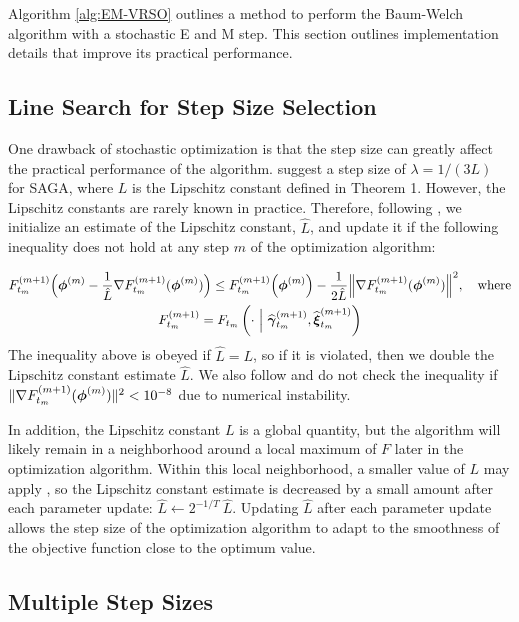 Algorithm \ref{alg:EM-VRSO} outlines a method to perform the Baum-Welch algorithm with a stochastic E and M step. This section outlines implementation details that improve its practical performance.

\subsection{Line Search for Step Size Selection}
\label{subsec:est_L}

One drawback of stochastic optimization is that the step size can greatly affect the practical performance of the algorithm. \citet{Defazio:2014} suggest a step size of $\lambda = 1/(3L)$ for SAGA, where $L$ is the Lipschitz constant defined in Theorem 1. However, the Lipschitz constants are rarely known in practice. Therefore, following \citet{Schmidt:2017}, we initialize an estimate of the Lipschitz constant, $\hat L$, and update it if the following inequality does not hold at any step $m$ of the optimization algorithm:

\begin{gather}
    F^{(m+1)}_{t_m}\Big(\boldsymbol{\phi}^{(m)} - \frac{1}{\hat L} \nabla F_{t_m}^{(m+1)}(\boldsymbol{\phi}^{(m)}) \Big) \leq F^{(m+1)}_{t_m}\Big(\boldsymbol{\phi}^{(m)}\Big) - \frac{1}{2 \hat L} \Big\| \nabla F_{t_m}^{(m+1)}(\boldsymbol{\phi}^{(m)}) \Big\| ^2, \quad \text{where} \nonumber \\
    F_{t_m}^{(m+1)} = F_{t_m}\left(\cdot ~ \Big | ~ \widehat {\boldsymbol{\gamma}}^{(m+1)}_{t_m}, \widehat {\boldsymbol{\xi}}^{(m+1)}_{t_m}\right)
    \label{ineq:F}
\end{gather}
%
The inequality above is obeyed if $\hat L = L$, so if it is violated, then we double the Lipschitz constant estimate $\hat L$. We also follow \citet{Schmidt:2017} and do not check the inequality if $\| \nabla F_{t_m}^{(m+1)}(\boldsymbol{\phi}^{(m)})\|^2 < 10^{-8}$ due to numerical instability. 

In addition, the Lipschitz constant $L$ is a global quantity, but the algorithm will likely remain in a neighborhood around a local maximum of $F$ later in the optimization algorithm. Within this local neighborhood, a smaller value of $L$ may apply \citep{Schmidt:2017}, so the Lipschitz constant estimate is decreased by a small amount after each parameter update: $\hat L \leftarrow 2^{-1/T} ~ \hat L$. Updating $\hat L$ after each parameter update allows the step size of the optimization algorithm to adapt to the smoothness of the objective function close to the optimum value.

\subsection{Multiple Step Sizes}

